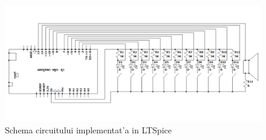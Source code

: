 \vspace{10mm}
\begin{figure}[ht]
\centering
\includegraphics[scale=0.5]{Fisiere/Schema Arduino}
\caption {Schema circuitului implementat'a in LTSpice}
\end{figure}
\FloatBarrier